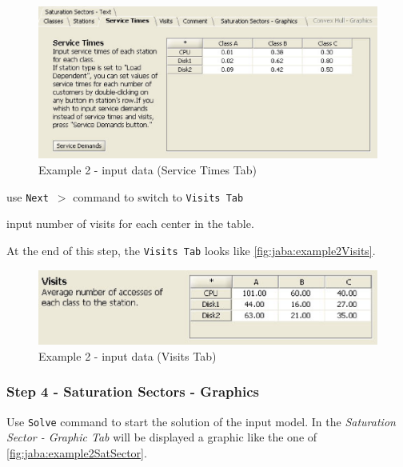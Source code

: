 \begin{figure}[htbp]
    \begin{center}
        \includegraphics[scale=.70]{img/jaba/example2Service}
    \end{center}
    \caption{Example 2 - input data (Service Times Tab)}
    \label{fig:jaba:example2Service}
\end{figure}

\begin{itemize*}
\item use \texttt{Next $>$} command to switch to \texttt{Visits Tab}
\item input number of visits for each center in the
table. 
\end{itemize*}

At the end of this step, the \texttt{Visits Tab} looks like
\autoref{fig:jaba:example2Visits}.

\begin{figure}[htbp]
    \begin{center}
        \includegraphics[scale=.8]{img/jaba/example2Visits}
    \end{center}
    \caption{Example 2 - input data (Visits Tab)}
    \label{fig:jaba:example2Visits}
\end{figure}


\subsubsection{Step 4 - Saturation Sectors - Graphics}


Use \texttt{Solve} command to start the solution of the input model.
In the \textit{Saturation Sector - Graphic Tab} will be displayed a graphic like the one of
\autoref{fig:jaba:example2SatSector}.

